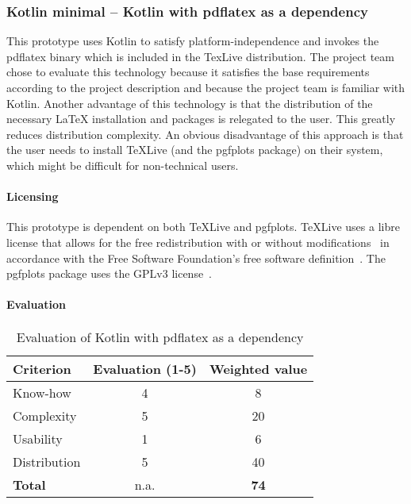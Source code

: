 \subsubsection{Kotlin minimal – Kotlin with pdflatex as a dependency}\label{subsubsec:kotlin_minimal}
This prototype uses Kotlin to satisfy platform-independence and invokes the pdflatex binary which is included in the TexLive distribution.
The project team chose to evaluate this technology because it satisfies the base requirements according to the project description and because
the project team is familiar with Kotlin.
Another advantage of this technology is that the distribution of the necessary LaTeX installation and packages is relegated to the user.
This greatly reduces distribution complexity.\newline
An obvious disadvantage of this approach is that the user needs to install TeXLive (and the pgfplots package) on their system, which might be difficult for non-technical users.

\paragraph{Licensing}\mbox{}\newline
This prototype is dependent on both TeXLive and pgfplots.
TeXLive uses a libre license that allows for the free redistribution with or without modifications~\cite{texlive_license} in accordance with the Free Software Foundation's free software definition~\cite{fsf_free_software}.
The pgfplots package uses the GPLv3 license~\cite{pgfplots}.

\paragraph{Evaluation}\mbox{}\newline
\begin{table}[H]
    \centering
    \begin{tabular}{l c c}
        \toprule
        \textbf{Criterion} & \textbf{Evaluation (1{-}5)} & \textbf{Weighted value} \\
        \midrule
        Know-how           & 4                           & 8                       \\
        \midrule
        Complexity         & 5                           & 20                      \\
        \midrule
        Usability          & 1                           & 6                       \\
        \midrule
        Distribution       & 5                           & 40                      \\
        \midrule
        \textbf{Total}     & n.a.                        & \textbf{74}             \\
        \bottomrule
    \end{tabular}
    \caption{Evaluation of Kotlin with pdflatex as a dependency}\label{table:kotlin_minimal_evaluation}
\end{table}

